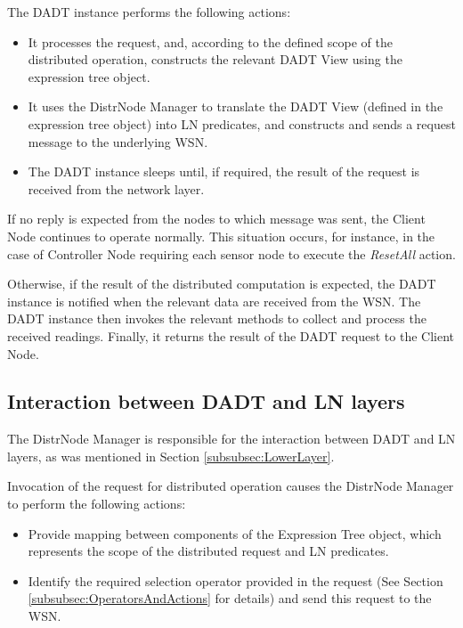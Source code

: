 The DADT instance performs the following actions:
  \begin{itemize} 
    \item It processes the request, and, according to the defined scope of the
    distributed operation, constructs the relevant DADT View using the
    expression tree object.
    \item It uses the DistrNode Manager to translate the DADT View
    (defined in the expression tree object) into LN predicates, and constructs and sends a request message to
    the underlying WSN.
    \item The DADT instance sleeps until, if required, the result of
    the request is received from the network layer.
  \end{itemize}
  
If no reply is expected from the nodes to which message was sent, the
Client Node continues to operate normally. This situation occurs, for instance,
in the case of Controller Node requiring each sensor node to execute the \emph{ResetAll} action.
 
Otherwise, if the result of the distributed computation is expected, the DADT
instance is notified when the relevant data are received from the WSN.
The DADT instance then invokes the relevant methods to collect and process the received
readings. Finally, it returns the result of the DADT request to
the Client Node.

\subsection{Interaction between DADT and LN layers} \label{subsec:DADTLNMapping}

The DistrNode Manager is responsible for the interaction between DADT and LN
layers, as was mentioned in Section \ref{subsubsec:LowerLayer}.

Invocation of the request for distributed operation causes the DistrNode Manager
to perform the following actions:
\begin{itemize}
  \item Provide mapping between components of the Expression Tree object, which
  represents the scope of the distributed request and LN predicates.
  \item Identify the required selection operator provided in the request
  (See Section \ref{subsubsec:OperatorsAndActions} for details) and send
  this request to the WSN.
\end{itemize}

